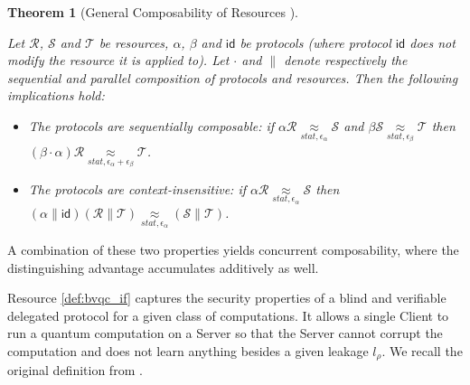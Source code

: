\documentclass[12pt]{iopart}
\renewcommand{\1}{\mathds{1}}
\newtheorem{theorem}{Theorem}
\begin{document}
\begin{theorem}[General Composability of Resources {\cite[Theorem~1]{MR11:abstract-cryptography}}]
\label{thm:ac-compos}

Let $\mathcal{R}$, $\mathcal{S}$ and $\mathcal{T}$ be resources, $\alpha$, $\beta$ and $\mathsf{id}$ be protocols (where protocol $\mathsf{id}$ does not modify the resource it is applied to). Let $\cdot$ and $\parallel$ denote respectively the sequential and parallel composition of protocols and resources. Then the following implications hold:

\begin{itemize}
\item The protocols are \emph{sequentially composable}: if $\alpha \mathcal{R} \!\!\!\underset{\mathit{stat}, \epsilon_{\alpha}}{\approx}\!\!\! \mathcal{S}$ and $\beta \mathcal{S} \!\!\!\underset{\mathit{stat}, \epsilon_{\beta}}{\approx}\!\!\! \mathcal{T}$ then $(\beta \cdot \alpha) \mathcal{R} \!\!\!\underset{\mathit{stat}, \epsilon_{\alpha} + \epsilon_{\beta}}{\approx}\!\!\! \mathcal{T}$.
\item The protocols are \emph{context-insensitive}: if $\alpha \mathcal{R} \!\!\!\underset{\mathit{stat}, \epsilon_{\alpha}}{\approx}\!\!\! \mathcal{S}$ then $(\alpha \parallel \mathsf{id}) (\mathcal{R} \parallel \mathcal{T}) \!\!\!\underset{\mathit{stat}, \epsilon_{\alpha}}{\approx}\!\!\! (\mathcal{S} \parallel \mathcal{T})$.
\end{itemize}
\end{theorem}

A combination of these two properties yields concurrent composability, where the distinguishing advantage accumulates additively as well.

Resource \ref{def:bvqc_if} captures the security properties of a blind and verifiable delegated protocol for a given class of computations. It allows a single Client to run a quantum computation on a Server so that the Server cannot corrupt the computation and does not learn anything besides a given leakage $l_{\rho}$. We recall the original definition from \cite[Definition 4.2]{DFPR14:composable}.
\end{document}
